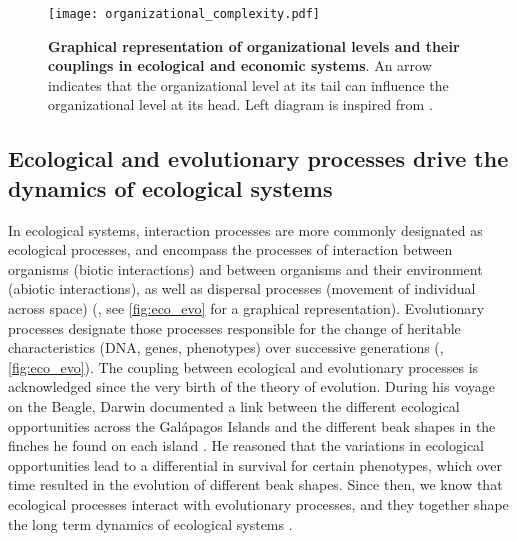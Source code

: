 \begin{figure}[ht]
    \centering
    \texttt{[image: organizational\_complexity.pdf]}
\caption{\textbf{Graphical representation of organizational levels and their couplings in ecological and economic systems}. An arrow indicates that the organizational level at its tail can influence the organizational level at its head. Left diagram is inspired from \cite{Hendry+2016}.}
\label{fig:organisational_levels}
\end{figure}

\subsection{Ecological and evolutionary processes drive the dynamics of ecological systems}
 
In ecological systems, interaction processes are more commonly designated as ecological processes, and encompass the processes of interaction between organisms (biotic interactions) and between organisms and their environment (abiotic interactions), as well as dispersal processes (movement of individual across space) (\cite{Vellend2010a}, see \cref{fig:eco_evo} for a graphical representation).
% 
Evolutionary processes designate those processes responsible for the change of heritable characteristics (DNA, genes, phenotypes) over successive generations (\cite{Hall2013}, \cref{fig:eco_evo}).
% 
The coupling between ecological and evolutionary processes is acknowledged since the very birth of the theory of evolution. 
% 
During his voyage on the Beagle, Darwin documented a link between the different ecological opportunities across the Galápagos Islands and the different beak shapes in the finches he found on each island \citep{darwin2004origin}.
% 
He reasoned that the variations in ecological opportunities lead to a differential in survival for certain phenotypes, which over time resulted in the evolution of different beak shapes.
% 
Since then, we know that ecological processes interact with evolutionary processes, and they together shape the long term dynamics of ecological systems \citep{Urban2016,Rahbek2019a,Rangel2018,Hagen2022}.

